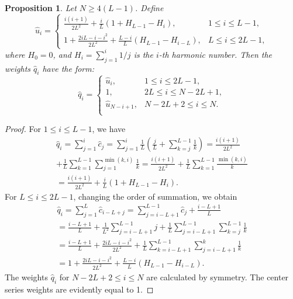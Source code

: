 \documentclass[sii]{ipart}
\newtheorem{proposition}{Proposition}
\begin{document}
\begin{proposition} \label{myserweightstat}
	Let $N \ge 4(L-1)$. Define
	\begin{equation*}
	\hat{u}_i = \begin{cases}
	\frac{i(i+1)}{2 L^2} + \frac{i}{L}(1 + H_{L-1} - H_i), &1 \le i \le L-1, \\
	1 + \frac{2iL-i-i^2}{2L^2} + \frac{L-i}{L}(H_{L-1} - H_{i - L}), & L \le i \le 2L-1,
	\end{cases}
	\end{equation*}
	where $H_0 = 0$, and $H_i = \sum_{j=1}^i 1/j$ is the $i$-th harmonic number.
	 Then the weights $\hat{q}_i$ have the form:
	\begin{equation*}
	\hat{q}_i = \begin{cases}
	\hat{u}_i, &1 \le i \le 2L-1, \\
		1, &2L \le i \le N-2L+1,\\
\hat{u}_{N-i+1}, &N-2L+2 \le i \le N. \\
	\end{cases}
	\end{equation*}
\end{proposition}

\begin{proof}
	For $1 \le i \le L-1$, we have
	\begin{multline*}
	\hat{q}_i = \sum_{j=1}^i \hat{c}_j = \sum_{j=1}^i \frac{1}{L}\left(\frac{j}{L} + \sum_{k=j}^{L-1}\frac{1}{k}\right)\! =
	\frac{i(i+1)}{2L^2} \\ + \frac{1}{L} \sum_{k = 1}^{L-1} \sum_{j=1}^{\min(k,i)} \frac{1}{k} = \frac{i(i+1)}{2L^2}+\frac{1}{L} \sum_{k = 1}^{L-1} \frac{\min(k,i)}{k} \\ = \frac{i(i+1)}{2 L^2} + \frac{i}{L}(1 + H_{L-1} - H_i).
	\end{multline*}
	For $L \le i \le 2L-1$, changing the order of summation, we obtain
	\begin{multline*}
	\hat{q}_i = \sum_{j = 1}^L \hat{c}_{i-L+j} = \sum_{j = i - L + 1}^{L - 1} \hat{c}_j + \frac{i - L + 1}{L} \\
	=\frac{i - L + 1}{L} + \frac{1}{L^2} \sum_{j = i - L + 1}^{L-1}j + \frac{1}{L} \sum_{j = i-L + 1}^{L-1} \sum_{k=j}^{L-1}\frac{1}{k} \\
	=\frac{i - L + 1}{L} + \frac{2iL - i - i^2}{2L^2} + \frac{1}{L} \sum_{k = i - L + 1}^{L - 1} \sum_{j = i - L + 1}^k \frac{1}{k} \\
	=1 + \frac{2iL-i-i^2}{2L^2} + \frac{L-i}{L}(H_{L-1} - H_{i - L}).
	\end{multline*}
	The weights $\hat{q}_i$ for $N-2L+2 \le i \le N$ are calculated by symmetry. The center series weights are evidently equal to 1.
\end{proof}
\end{document}
